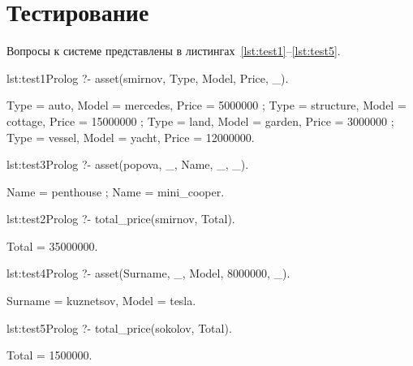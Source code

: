 \section{Тестирование}
Вопросы к системе представлены в листингах~\ref{lst:test1}--\ref{lst:test5}.

\begin{listing}{lst:test1}{Prolog}
?- asset(smirnov, Type, Model, Price, _).

Type = auto, Model = mercedes, Price = 5000000 ;
Type = structure, Model = cottage, Price = 15000000 ;
Type = land, Model = garden, Price = 3000000 ;
Type = vessel, Model = yacht, Price = 12000000.
\end{listing}

\begin{listing}{lst:test3}{Prolog}
?- asset(popova, _, Name, _, _).

Name = penthouse ;
Name = mini_cooper.
\end{listing}

\begin{listing}{lst:test2}{Prolog}
?- total_price(smirnov, Total).

Total = 35000000.
\end{listing}

\begin{listing}{lst:test4}{Prolog}
?- asset(Surname, _, Model, 8000000, _).

Surname = kuznetsov,
Model = tesla.
\end{listing}

\begin{listing}{lst:test5}{Prolog}
?- total_price(sokolov, Total).

Total = 1500000.
\end{listing}
